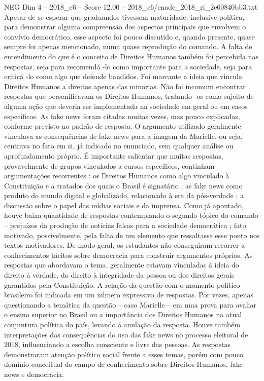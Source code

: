 \begin{textsample}{NEG Dim 4 – 2018\_c6 – Score 12.00 – 2018\_c6/enade\_2018\_ri\_2e60840bb3.txt}
Apesar de se esperar que graduandos tivessem maturidade, inclusive política, para demonstrar alguma compreensão dos aspectos principais que envolvem o convívio democrático, esse aspecto foi pouco discutido e, quando presente, quase sempre foi apenas mencionado, numa quase reprodução do comando.
A falta de entendimento do que é o conceito de Direitos Humanos também foi percebida nas respostas, seja para recomendá -lo como importante para a sociedade, seja para criticá -lo como algo que defende bandidos.
Foi marcante a ideia que vincula Direitos Humanos a direitos apenas das minorias.
Não foi incomum encontrar respostas que personificavam os Direitos Humanos, tratando -os como sujeito de alguma ação que deveria ser implementada na sociedade em geral ou em casos específicos.
As fake news foram citadas muitas vezes, mas pouco explicadas, conforme previsto no padrão de resposta.
O argumento utilizado geralmente vinculava as consequências de fake news para a imagem da Marielle, ou seja, centrava no fato em si, já indicado no enunciado, sem qualquer análise ou aprofundamento próprio.
É importante salientar que muitas respostas, provavelmente de grupos vinculados a cursos específicos, continham argumentações recorrentes : os Direitos Humanos como algo vinculado à Constituição e a tratados dos quais o Brasil é signatário ; as fake news como produto do mundo digital e globalizado, relacionado à era da pós-verdade ; a discussão sobre o papel das mídias sociais e da imprensa.
Como já apontado, houve baixa quantidade de respostas contemplando o segundo tópico do comando – prejuízos da produção de notícias falsas para a sociedade democrática ; fato motivado, possivelmente, pela falta de um elemento que ressaltasse esse ponto nos textos motivadores.
De modo geral, os estudantes não conseguiram recorrer a conhecimentos tácitos sobre democracia para construir argumentos próprios.
As respostas que abordavam o tema, geralmente estavam vinculadas à ideia do direito à verdade, do direito à integridade da pessoa ou dos direitos gerais garantidos pela Constituição.
A relação da questão com o momento político brasileiro foi indicada em um número expressivo de respostas.
Por vezes, apenas questionando a temática da questão – caso Marielle – em uma prova para avaliar o ensino superior no Brasil ou a importância dos Direitos Humanos na atual conjuntura política do país, levando à anulação da resposta.
Houve também interpretações das consequências do uso das fake news no processo eleitoral de 2018, influenciando a escolha consciente e livre das pessoas.
As respostas demonstraram atenção político social frente a esses temas, porém com pouco domínio conceitual do campo de conhecimento sobre Direitos Humanos, fake news e democracia.

\end{textsample}
